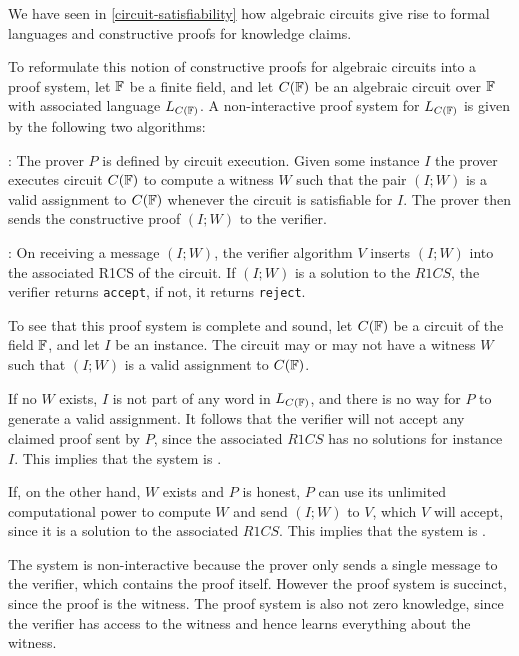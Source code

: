 \begin{example} We have seen in \ref{circuit-satisfiability} how algebraic circuits give rise to formal languages and constructive proofs for knowledge claims.

To reformulate this notion of constructive proofs for algebraic circuits into a proof system, let $\mathbb{F}$ be a finite field, and let $C(\mathbb{F})$ be an algebraic circuit over $\mathbb{F}$ with associated language $L_{C(\mathbb{F})}$. A non-interactive proof system for $L_{C(\mathbb{F})}$ is given by the following two algorithms:

: The prover $P$ is defined by circuit execution. Given some instance $I$ the prover executes circuit $C(\mathbb{F})$ to compute a witness $W$ such that the pair $(I;W)$ is a valid assignment to $C(\mathbb{F})$ whenever the circuit is satisfiable for $I$. The prover then sends the constructive proof $(I;W)$ to the verifier.

: On receiving a message $(I;W)$, the verifier algorithm $V$ inserts $(I;W)$ into the associated R1CS of the circuit. If $(I;W)$ is a solution to the $R1CS$, the verifier returns \texttt{accept}, if not, it returns \texttt{reject}. 

To see that this proof system is complete and sound, let $C(\mathbb{F})$ be a circuit of the field $\mathbb{F}$, and let $I$ be an instance. The circuit may or may not have a witness $W$ such that $(I;W)$ is a valid assignment to $C(\mathbb{F})$. 

If no $W$ exists, $I$ is not part of any word in $L_{C(\mathbb{F})}$, and there is no way for $P$ to generate a valid assignment. It follows that the verifier will not accept any claimed proof sent by $P$, since the associated $R1CS$ has no solutions for instance $I$. This implies that the system is .

If, on the other hand, $W$ exists and $P$ is honest, $P$ can use its unlimited computational power to compute $W$ and send $(I;W)$ to $V$, which $V$ will accept, since it is a solution to the associated $R1CS$. This implies that the system is .

The system is non-interactive because the prover only sends a single message to the verifier, which contains the proof itself. However the proof system is  succinct, since the proof is the witness. The proof system is also not zero knowledge, since the verifier has access to the witness and hence learns everything about the witness.
\end{example}
